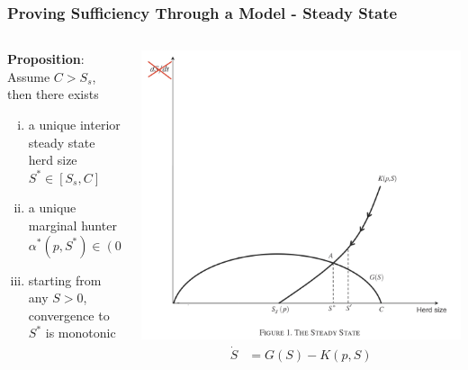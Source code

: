 \documentclass[aspectratio=169, 12pt, final]{beamer}
\begin{document}
\begin{frame}
\frametitle{Proving Sufficiency Through a Model - Steady State}
\begin{columns}
\begin{column}{0.6\textwidth}
\footnotesize{
\textbf{Proposition}: Assume $C > S_s$, then there exists}
\begin{enumerate}[(i)]
 	\item \footnotesize{a unique interior steady state herd size $S^* \in [S_s, C]$}
 	\item \footnotesize{a unique marginal hunter $\alpha^*(p, S^*) \in (0, \bar{\alpha})$}
 	\item \footnotesize{starting from any $S > 0$, convergence to $S^*$ is monotonic}
 \end{enumerate}
\end{column}
\begin{column}{0.5\textwidth}  %
    \begin{center}
     \includegraphics[width=1\textwidth]{Figure1a.jpeg}
     \begin{align*}
	\dot{S} &= G(S) - K(p, S)
\end{align*}
     \end{center}
\end{column}
\end{columns}
\end{frame}
\end{document}
